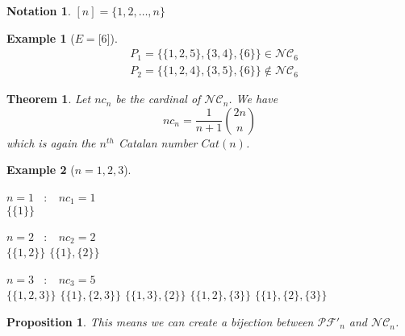 \documentclass[12pt]{report}
\newtheorem{theorem}{Theorem}
\newtheorem*{prop}{Proposition}
\newtheorem*{example}{Example}
\newtheorem*{notation}{Notation}
\begin{document}
\begin{notation}
    $[n] = \{1, 2, \ldots, n\}$
\end{notation}

\begin{example}[$E = \lbrack 6 \rbrack $]
    \begin{align*}
        &P_1 = \{\{1, 2, 5\}, \{3, 4\}, \{6\}\} \in \mathcal{NC}_6\\
        &P_2 = \{\{1, 2, 4\}, \{3, 5\}, \{6\}\} \notin \mathcal{NC}_6
    \end{align*}
\end{example}

\begin{theorem}
    Let $nc_n$ be the cardinal of $\mathcal{NC}_n$.
    We have $$nc_n = \frac{1}{n + 1} \binom{2n}{n}$$
    which is again the $n^{th}$ Catalan number
    $Cat(n)$.
\end{theorem}

\begin{example}[$n = 1, 2, 3$]
    ~\\
    \begin{itemize*}
        \item $n = 1$ \  $:$ \  $nc_1 = 1$\\
        \subitem $\{\{1\}\}$\\
        \item $n = 2$ \  $:$ \  $nc_2 = 2$\\
        \subitem $\{\{1, 2\}\}$
        \subitem $\{\{1\}, \{2\}\}$\\
        \item $n = 3$ \  $:$ \  $nc_3 = 5$\\
        \subitem $\{\{1, 2, 3\}\}$
        \subitem $\{\{1\}, \{2, 3\}\}$
        \subitem $\{\{1, 3\}, \{2\}\}$
        \subitem $\{\{1, 2\}, \{3\}\}$
        \subitem $\{\{1\}, \{2\}, \{3\}\}$\\
    \end{itemize*}
\end{example}

\begin{prop}
    This means we can create a \emph{bijection} between
    $\mathcal{PF'}_n$ and $\mathcal{NC}_n$.
\end{prop}
\end{document}
